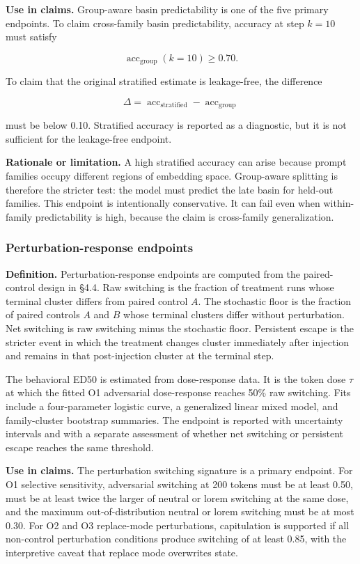 \documentclass{article}
\theoremstyle{plain}
\theoremstyle{definition}
\begin{document}
\textbf{Use in claims.} Group-aware basin predictability is one of the five primary endpoints. To claim cross-family basin predictability, accuracy at step \(k=10\) must satisfy

\[\operatorname{acc}_{\mathrm{group}}(k=10)\geq0.70.\]

To claim that the original stratified estimate is leakage-free, the difference

\[\Delta=\operatorname{acc}_{\mathrm{stratified}}-\operatorname{acc}_{\mathrm{group}}\]

must be below 0.10. Stratified accuracy is reported as a diagnostic, but it is not sufficient for the leakage-free endpoint.

\textbf{Rationale or limitation.} A high stratified accuracy can arise because prompt families occupy different regions of embedding space. Group-aware splitting is therefore the stricter test: the model must predict the late basin for held-out families. This endpoint is intentionally conservative. It can fail even when within-family predictability is high, because the claim is cross-family generalization.

\subsubsection{Perturbation-response endpoints}

\textbf{Definition.} Perturbation-response endpoints are computed from the paired-control design in §4.4. Raw switching is the fraction of treatment runs whose terminal cluster differs from paired control \(A\). The stochastic floor is the fraction of paired controls \(A\) and \(B\) whose terminal clusters differ without perturbation. Net switching is raw switching minus the stochastic floor. Persistent escape is the stricter event in which the treatment changes cluster immediately after injection and remains in that post-injection cluster at the terminal step.

The behavioral ED50 is estimated from dose-response data. It is the token dose \(\tau\) at which the fitted O1 adversarial dose-response reaches 50\% raw switching. Fits include a four-parameter logistic curve, a generalized linear mixed model, and family-cluster bootstrap summaries. The endpoint is reported with uncertainty intervals and with a separate assessment of whether net switching or persistent escape reaches the same threshold.

\textbf{Use in claims.} The perturbation switching signature is a primary endpoint. For O1 selective sensitivity, adversarial switching at 200 tokens must be at least 0.50, must be at least twice the larger of neutral or lorem switching at the same dose, and the maximum out-of-distribution neutral or lorem switching must be at most 0.30. For O2 and O3 replace-mode perturbations, capitulation is supported if all non-control perturbation conditions produce switching of at least 0.85, with the interpretive caveat that replace mode overwrites state.
\end{document}

